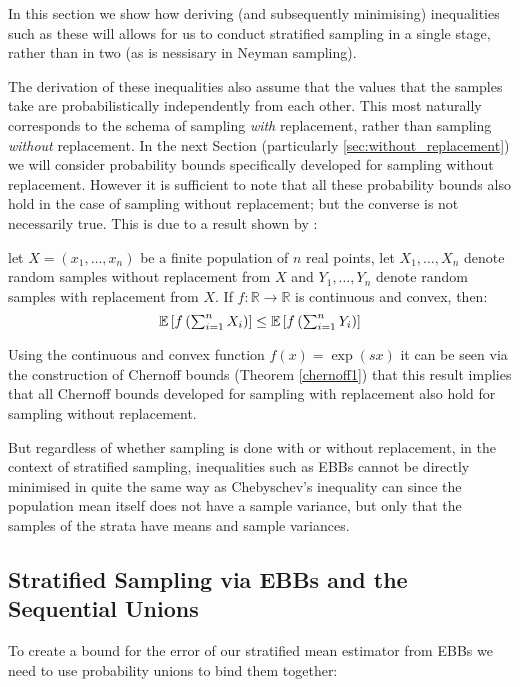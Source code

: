 In this section we show how deriving (and subsequently minimising) inequalities such as these will allows for us to conduct stratified sampling in a single stage, rather than in two (as is nessisary in Neyman sampling).

The derivation of these inequalities also assume that the values that the samples take are probabilistically independently from each other.  This most naturally corresponds to the schema of sampling \textit{with} replacement, rather than sampling \textit{without} replacement.
In the next Section (particularly \ref{sec:without_replacement}) we will consider probability bounds specifically developed for sampling without replacement. However it is sufficient to note that all these probability bounds also hold in the case of sampling without replacement; but the converse is not necessarily true. 
This is due to a result shown by \cite{hoeffding1}:

\begin{lemma}\label{hoeffdings_reduction}
let $X=(x_1,\dots,x_n)$ be a finite population of $n$ real points, let $X_1,\dots,X_n$ denote random samples without replacement from $X$ and $Y_1,\dots,Y_n$ denote random samples with replacement from $X$. 
If $f:\mathbb{R}\rightarrow\mathbb{R}$ is continuous and convex, then:
$$\textstyle \operatorname{\mathbb{E}}\left[f\left(\sum_{i=1}^nX_i\right)\right]\le\operatorname{\mathbb{E}}\left[f\left(\sum_{i=1}^nY_i\right)\right] $$
\end{lemma}

Using the continuous and convex function $f(x)=\exp(sx)$ it can be seen via the construction of Chernoff bounds (Theorem \ref{chernoff1}) that this result implies that all Chernoff bounds developed for sampling with replacement also hold for sampling without replacement.

But regardless of whether sampling is done with or without replacement, in the context of stratified sampling, inequalities such as EBBs cannot be directly minimised in quite the same way as Chebyschev's inequality can since the population mean itself does not have a sample variance, but only that the samples of the strata have means and sample variances.

\subsection{Stratified Sampling via EBBs and the Sequential Unions}

To create a bound for the error of our stratified mean estimator from EBBs we need to use probability unions to bind them together:

